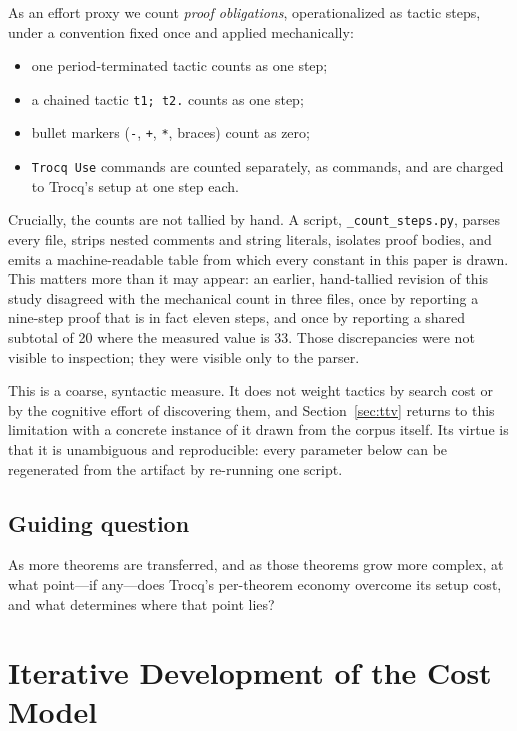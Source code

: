 \documentclass[runningheads]{llncs}
\begin{document}
As an effort proxy we count \emph{proof obligations}, operationalized as
tactic steps, under a convention fixed once and applied mechanically:

\begin{itemize}
\item one period-terminated tactic counts as one step;
\item a chained tactic \texttt{t1; t2.} counts as one step;
\item bullet markers (\texttt{-}, \texttt{+}, \texttt{*}, braces) count as zero;
\item \texttt{Trocq Use} commands are counted separately, as commands, and
      are charged to Trocq's setup at one step each.
\end{itemize}

Crucially, the counts are not tallied by hand. A script,
\texttt{\_count\_steps.py}, parses every file, strips nested comments and
string literals, isolates proof bodies, and emits a machine-readable table
from which every constant in this paper is drawn. This matters more than it
may appear: an earlier, hand-tallied revision of this study disagreed with
the mechanical count in three files, once by reporting a nine-step proof that
is in fact eleven steps, and once by reporting a shared subtotal of 20 where
the measured value is 33. Those discrepancies were not visible to inspection;
they were visible only to the parser.

This is a coarse, syntactic measure. It does not weight tactics by search
cost or by the cognitive effort of discovering them, and
Section~\ref{sec:ttv} returns to this limitation with a concrete instance of
it drawn from the corpus itself. Its virtue is that it is unambiguous and
reproducible: every parameter below can be regenerated from the artifact by
re-running one script.

\subsection{Guiding question}

As more theorems are transferred, and as those theorems grow more complex, at
what point---if any---does Trocq's per-theorem economy overcome its setup
cost, and what determines where that point lies?


\section{Iterative Development of the Cost Model}
\label{sec:model}
\end{document}
